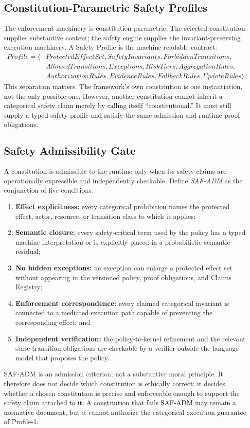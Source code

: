 \documentclass[11pt]{article}
\def\mathsf#1{#1}%
\begin{document}
\subsection{Constitution-Parametric Safety Profiles}\label{sec:safety-constitution}
The enforcement machinery is constitution-parametric. The selected constitution supplies substantive content; the safety engine supplies the invariant-preserving execution machinery. A Safety Profile is the machine-readable contract:
\[
\begin{aligned}
\mathsf{Profile}=\langle&ProtectedEffectSet,SafetyInvariants,ForbiddenTransitions,\\
&AllowedTransitions,Exceptions,RiskTiers,AggregationRules,\\
&AuthorizationRules,EvidenceRules,FallbackRules,UpdateRules\rangle.
\end{aligned}
\]
This separation matters. The framework's own constitution is one instantiation, not the only possible one. However, another constitution cannot inherit a categorical safety claim merely by calling itself ``constitutional.'' It must still supply a typed safety profile and satisfy the same admission and runtime proof obligations.

\subsection{Safety Admissibility Gate}
A constitution is admissible to the runtime only when its safety claims are operationally expressible and independently checkable. Define \emph{SAF-ADM} as the conjunction of five conditions:
\begin{enumerate}
\item \textbf{Effect explicitness:} every categorical prohibition names the protected effect, actor, resource, or transition class to which it applies;
\item \textbf{Semantic closure:} every safety-critical term used by the policy has a typed machine interpretation or is explicitly placed in a probabilistic semantic residual;
\item \textbf{No hidden exceptions:} no exception can enlarge a protected effect set without appearing in the versioned policy, proof obligations, and Claims Registry;
\item \textbf{Enforcement correspondence:} every claimed categorical invariant is connected to a mediated execution path capable of preventing the corresponding effect; and
\item \textbf{Independent verification:} the policy-to-kernel refinement and the relevant state-transition obligations are checkable by a verifier outside the language model that proposes the policy.
\end{enumerate}
SAF-ADM is an admission criterion, not a substantive moral principle. It therefore does not decide which constitution is ethically correct; it decides whether a chosen constitution is precise and enforceable enough to support the safety claim attached to it. A constitution that fails SAF-ADM may remain a normative document, but it cannot authorize the categorical execution guarantee of Profile-1.
\end{document}
